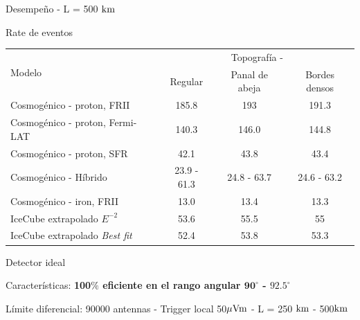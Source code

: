 \begin{frame}{Desempe\~no - L = 500 ${\rm km}$}
	\begin{block}{Rate de eventos}
		\begin{center}
		\renewcommand{\arraystretch}{1.3}
		\footnotesize
		\begin{tabular}{lccc}
			\hline
			\multirow{2}{*}{Modelo} & \multicolumn{3}{c}{Topograf\'ia - \cant{L=500}{km}} \\
			&   Regular &   Panal de abeja &   Bordes densos \\
			\hline
			Cosmogénico - proton, FRII &    185.8 &            193   &           191.3 \\
			Cosmogénico - proton, Fermi-LAT &     140.3 &             146.0 &           144.8 \\
			Cosmogénico - proton, SFR &     42.1 &             43.8   &            43.4 \\
			Cosmogénico - H\'ibrido &  23.9 - 61.3 &   24.8 - 63.7 &  24.6 - 63.2 \\
			Cosmogénico - iron, FRII &     13.0   &        13.4 &            13.3 \\
			IceCube extrapolado $E^{-2}$ &      53.6 &         55.5   &            55   \\
			IceCube extrapolado \emph{Best fit} &    52.4 &  53.8  &   53.3 \\
			\hline
		\end{tabular}
		\end{center}
	\end{block}
\end{frame}

\begin{frame}{Detector ideal}
\footnotesize
		\begin{alertblock}{Caracter\'isticas:}
		 \centering
		 \textbf{100$\bm\%$ eficiente en el rango angular $\bm{90^\circ}$ - $\bm{92.5^\circ}$}
		\end{alertblock}

		\begin{block}{\scriptsize L\'imite diferencial: 90000 antennas - Trigger local 50${\rm \mu Vm}$ - L = 250 ${\rm km}$ - 500${\rm km}$}
			\begin{center}
			\end{center}
		\end{block}
\end{frame}